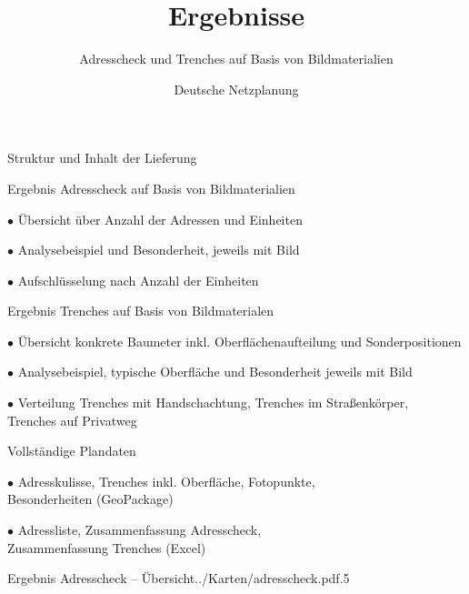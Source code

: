 \documentclass[11pt, dvipsnames,aspectratio=169]{beamer}
\author[DNP]{Deutsche Netzplanung}
\title[Ergebnisse \Ort]{\textbf{Ergebnisse} \\ \Ort}
\subtitle{Adresscheck und Trenches auf Basis von Bildmaterialien}
\date{\Abgabedatum}
\begin{document}
	
{
\maketitle
}

\begin{frame}{Struktur und Inhalt der Lieferung \Ort}
	\begin{bulletlist}{5pt}
		\item Ergebnis Adresscheck auf Basis von Bildmaterialien
			\begin{bulletlist}{3pt}
				\item[$\bullet$] Übersicht über Anzahl der Adressen und Einheiten
				\item[$\bullet$] Analysebeispiel und Besonderheit, jeweils mit Bild
				\item[$\bullet$] Aufschlüsselung nach Anzahl der Einheiten
			\end{bulletlist}
		\item Ergebnis Trenches auf Basis von Bildmaterialen
		\begin{bulletlist}{3pt}
			\item[$\bullet$] Übersicht konkrete Baumeter inkl. Oberflächenaufteilung und Sonderpositionen
			\item[$\bullet$] Analysebeispiel, typische Oberfläche und Besonderheit jeweils mit Bild
			\item[$\bullet$] Verteilung Trenches mit Handschachtung, Trenches im Straßenkörper, \\ Trenches auf Privatweg
		\end{bulletlist}
		\item Vollständige Plandaten
		\begin{bulletlist}{3pt}
			\item[$\bullet$] Adresskulisse, Trenches inkl. Oberfläche, Fotopunkte, \\ Besonderheiten (GeoPackage)
			\item[$\bullet$] Adressliste, Zusammenfassung Adresscheck, \\ Zusammenfassung Trenches (Excel)
		\end{bulletlist}
	\end{bulletlist}
\end{frame}

\begin{mapframe}{Ergebnis Adresscheck -- Übersicht}{../Karten/adresscheck.pdf}{.5\linewidth}
	\centering
	\resizebox{\textwidth}{!}{\adressStatistik}
\end{mapframe}
\end{document}

